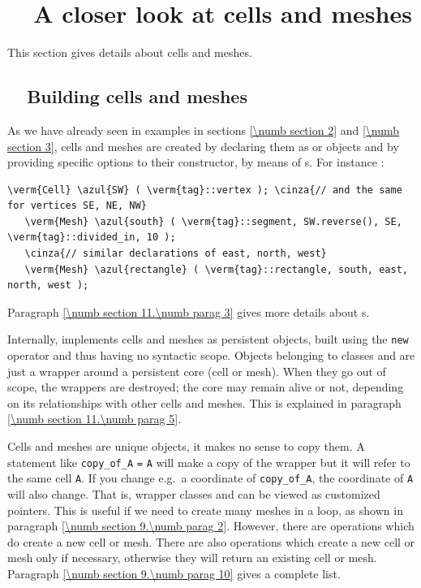 
\chapter{~~A closer look at cells and meshes}\label{\numb section 9}


This section gives details about cells and meshes.

\section{~~Building cells and meshes}\label{\numb section 9.\numb parag 1}

As we have already seen in examples in sections \ref{\numb section 2} and \ref{\numb section 3},
cells and meshes are created by declaring them as {\small\tt {}} or {\small\tt {}} objects
and by providing specific options to their constructor, by means of {\small\tt{}}s.
For instance :

\begin{Verbatim}[commandchars=\\\{\},formatcom=\small\tt,
   baselinestretch=0.94,framesep=2mm                      ]
   \verm{Cell} \azul{SW} ( \verm{tag}::vertex ); \cinza{// and the same for vertices SE, NE, NW}
   \verm{Mesh} \azul{south} ( \verm{tag}::segment, SW.reverse(), SE, \verm{tag}::divided_in, 10 );
   \cinza{// similar declarations of east, north, west}
   \verm{Mesh} \azul{rectangle} ( \verm{tag}::rectangle, south, east, north, west );
\end{Verbatim}

Paragraph \ref{\numb section 11.\numb parag 3} gives more details about {\small\tt{}}s.

Internally, {\maniFEM} implements cells and meshes as persistent objects, built
using the {\small\tt new} operator and thus having no syntactic scope.
Objects belonging to classes {\small\tt {}} and {\small\tt {}} are just a wrapper
around a persistent core (cell or mesh).
When they go out of scope, the wrappers are destroyed; the core may remain alive or not,
depending on its relationships with other cells and meshes.
This is explained in paragraph \ref{\numb section 11.\numb parag 5}.

Cells and meshes are unique objects, it makes no sense to copy them.
A statement like {\small\tt {}} {\small\tt copy\_of\_A} {\small\tt =} {\small\tt A}
will make a copy of the wrapper but it will refer to the same cell {\small\tt A}.
If you change e.g.\ a coordinate of {\small\tt copy\_of\_A}, the coordinate of {\small\tt A}
will also change.
That is, wrapper classes {\small\tt {}} and {\small\tt {}} can be viewed as
customized pointers.
This is useful if we need to create many meshes in a loop, as shown in paragraph
\ref{\numb section 9.\numb parag 2}.
However, there are operations which do create a new cell or mesh.
There are also operations which create a new cell or mesh only if necessary,
otherwise they will return an existing cell or mesh.
Paragraph \ref{\numb section 9.\numb parag 10} gives a complete list.

